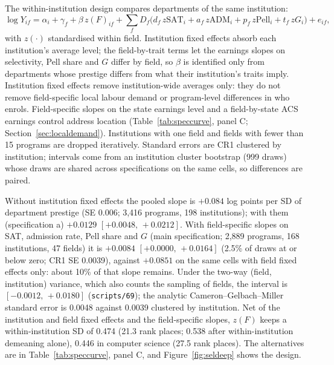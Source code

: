 \documentclass[11pt]{article}
\newcommand{\ci}[2]{$[#1,\allowbreak\,#2]$}
\newcommand{\scr}[1]{\texttt{scripts/#1}}
\begin{document}
The within-institution design compares departments of the same institution:
\begin{equation}
\log Y_{if}=\alpha_i+\gamma_f+\beta\,z(F)_{if}+\sum_f D_f\big(d_f\,z\text{SAT}_i+a_f\,z\text{ADM}_i+p_f\,z\text{Pell}_i+t_f\,zG_i\big)+e_{if},\label{eq:fe}
\end{equation}
with $z(\cdot)$ standardised within field. Institution fixed effects absorb each institution's average level;
the field-by-trait terms let the earnings slopes on selectivity, Pell share and $G$ differ by field, so $\beta$ is
identified only from departments whose prestige differs from what their institution's traits imply.
Institution fixed effects remove institution-wide averages only: they do not remove field-specific local
labour demand or program-level differences in who enrols. Field-specific slopes on the state earnings level and a
field-by-state ACS earnings control address location (Table~\ref{tab:speccurve}, panel C;
Section~\ref{sec:localdemand}).
Institutions with one field and fields with fewer than 15 programs are dropped iteratively. Standard errors are
CR1 clustered by institution; intervals come from an institution cluster bootstrap (999 draws) whose draws are
shared across specifications on the same cells, so differences are paired.

Without institution fixed effects the pooled slope is $+0.084$ log points per SD of department prestige (SE
0.006; 3,416 programs, 198 institutions); with them (specification a) $+0.0129$ \ci{+0.0048}{+0.0212}. With
field-specific slopes on SAT, admission rate, Pell share and $G$ (main specification; 2,889 programs, 168
institutions, 47 fields) it is $+0.0084$ \ci{+0.0000}{+0.0164} (2.5\% of draws at or below zero; CR1 SE 0.0039),
against $+0.0851$ on the same cells with field fixed effects only: about 10\% of that slope remains. Under the
two-way (field, institution) variance, which also counts the sampling of fields, the interval is
\ci{-0.0012}{+0.0180} (\scr{69}); the analytic Cameron--Gelbach--Miller standard error \citep{cameron2011robust} is 0.0048 against 0.0039
clustered by institution. Net of the institution and field fixed effects and the field-specific slopes, $z(F)$
keeps a within-institution SD of 0.474 (21.3 rank places; 0.538 after within-institution demeaning alone), 0.446
in computer science (27.5 rank places). The alternatives are in Table~\ref{tab:speccurve}, panel C, and
Figure~\ref{fig:seldeep} shows the design.
\end{document}
